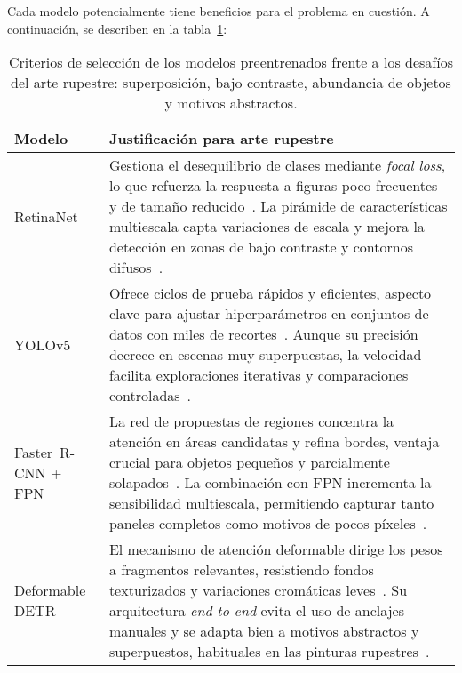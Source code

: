 Cada modelo potencialmente tiene beneficios para el problema en cuestión.
A continuación, se describen en la tabla~\ref{tab:justificacion_modelos}:

\begin{table}[!h]
    \centering
    \begin{tabular}{p{3.5cm} p{10.8cm}}
        \hline
        \textbf{Modelo} & \textbf{Justificación para arte rupestre} \\
        \hline
        RetinaNet &
        Gestiona el desequilibrio de clases mediante \emph{focal loss}, lo que refuerza la respuesta a figuras poco frecuentes y de tamaño reducido~\cite{lin2017focal,suhaimi2023}.
        La pirámide de características multiescala capta variaciones de escala y mejora la detección en zonas de bajo contraste y contornos difusos~\cite{esri_retinanet,wunderlich2023}. \\[0.4em]

        YOLOv5 &
        Ofrece ciclos de prueba rápidos y eficientes, aspecto clave para ajustar hiperparámetros en conjuntos de datos con miles de recortes~\cite{yolov5,suhaimi2023}.
        Aunque su precisión decrece en escenas muy superpuestas, la velocidad facilita exploraciones iterativas y comparaciones controladas~\cite{li2022}. \\[0.4em]

        Faster~R-CNN + FPN &
        La red de propuestas de regiones concentra la atención en áreas candidatas y refina bordes, ventaja crucial para objetos pequeños y parcialmente solapados~\cite{ren2015faster}.
        La combinación con FPN incrementa la sensibilidad multiescala, permitiendo capturar tanto paneles completos como motivos de pocos píxeles~\cite{suhaimi2023}. \\[0.4em]

        Deformable DETR &
        El mecanismo de atención deformable dirige los pesos a fragmentos relevantes, resistiendo fondos texturizados y variaciones cromáticas leves~\cite{zhu2021,smallobjDETR}.
        Su arquitectura \emph{end-to-end} evita el uso de anclajes manuales y se adapta bien a motivos abstractos y superpuestos, habituales en las pinturas rupestres~\cite{horn2022ai}. \\
    \end{tabular}
    \caption{Criterios de selección de los modelos preentrenados frente a los desafíos del arte rupestre: superposición, bajo contraste, abundancia de objetos y motivos abstractos.}
    \label{tab:justificacion_modelos}
\end{table}

